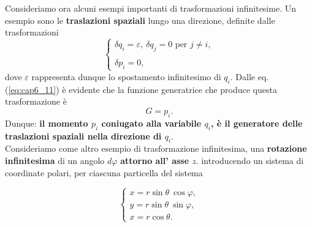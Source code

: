 Consideriamo ora alcuni esempi importanti di trasformazioni infinitesime. Un esempio sono le \textbf{traslazioni spaziali} lungo una direzione, definite dalle trasformazioni
\begin{equation}
\begin{cases}
\displaystyle{\delta q_i = \varepsilon, \  \delta q_j =0 \textrm{ per } j\neq i, }\\
\\
\displaystyle{\delta p_i = 0,}
\end{cases}
\end{equation}
dove $\varepsilon$ rappresenta dunque lo spostamento infinitesimo di $q_i$. Dalle eq. (\ref{eq:cap6_11}) è evidente che la funzione generatrice che produce questa trasformazione è
\begin{equation}
G=p_i .
\end{equation}
Dunque: \textbf{il momento $p_i$ coniugato alla variabile $q_i$, è il generatore delle traslazioni spaziali nella direzione di $q_i$}.\\
Consideriamo come altro esempio di trasformazione infinitesima, una \textbf{rotazione infinitesima} di un angolo $d\varphi$ \textbf{attorno all' asse $z$}. introducendo un sistema di coordinate polari, per ciascuna particella del sistema 
\begin{center}
\begin{minipage}{0.50\textwidth}
\centering
{}
%
%
\end{minipage}
\begin{minipage}[c]{0.4\textwidth}
\centering
\begin{equation}
\begin{cases} 
x= r \sin \theta \ \cos \varphi , \\
y= r \sin \theta \ \sin \varphi  ,\\
x= r \cos \theta .
\end{cases}
\end{equation}
\end{minipage}
\end{center}

